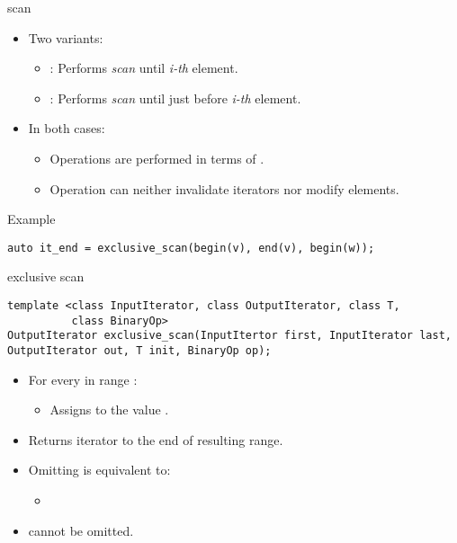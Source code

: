 \begin{frame}[t,fragile]{scan}
\begin{itemize}
  \item Two variants:
    \begin{itemize}
      \item {}: Performs \emph{scan} until \emph{i-th} element.
      \item {}: Performs \emph{scan} until just before \emph{i-th} element.
    \end{itemize}
  \item In both cases:
    \begin{itemize}
      \item Operations are performed in terms of .
      \item Operation can neither invalidate iterators nor modify elements.
    \end{itemize}
\end{itemize}
\begin{block}{Example}
\begin{lstlisting}[]
auto it_end = exclusive_scan(begin(v), end(v), begin(w));
\end{lstlisting}
\end{block}
\end{frame}

\begin{frame}[t,fragile]{exclusive scan}
\begin{lstlisting}[]
template <class InputIterator, class OutputIterator, class T, 
          class BinaryOp>
OutputIterator exclusive_scan(InputItertor first, InputIterator last, OutputIterator out, T init, BinaryOp op);
\end{lstlisting}
\begin{itemize}
  \item For every  in range \cppid{[out, out + (last-first))}:
    \begin{itemize}
      \item Assigns to  the value
        .
    \end{itemize}
  \item Returns iterator to the end of resulting range.
  \vfill
  \item Omitting  is equivalent to:
    \begin{itemize}
      \item {}
    \end{itemize}
  \item {} cannot be omitted.
\end{itemize}
\end{frame}


